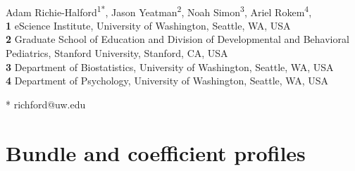 \documentclass[10pt,letterpaper]{article}
\begin{document}
\vspace*{0.2in}

\begin{flushleft}
{\Large
\textbf{} %
}
\newline
\\
Adam Richie-Halford\textsuperscript{1*},
Jason Yeatman\textsuperscript{2},
Noah Simon\textsuperscript{3},
Ariel Rokem\textsuperscript{4},
\\
\bigskip
\textbf{1} eScience Institute, University of Washington, Seattle, WA, USA
\\
\textbf{2} Graduate School of Education and Division of Developmental and Behavioral Pediatrics, Stanford University, Stanford, CA, USA
\\
\textbf{3} Department of Biostatistics, University of Washington, Seattle, WA, USA
\\
\textbf{4} Department of Psychology, University of Washington, Seattle, WA, USA
\\
\bigskip

* richford@uw.edu

\end{flushleft}

\section{Bundle and coefficient profiles}
\label{sec:bundle-profiles}
\end{document}

